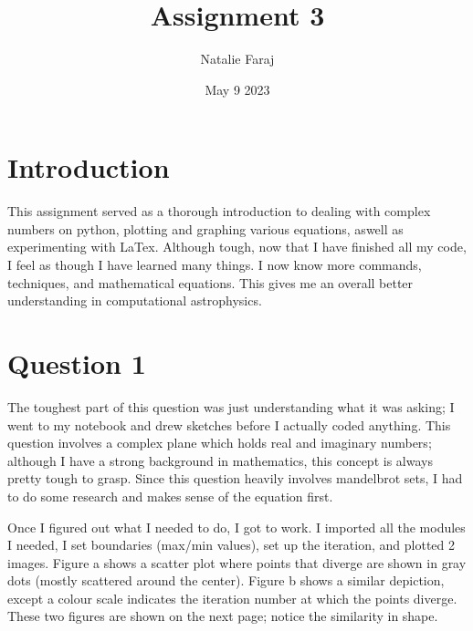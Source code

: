 \documentclass{article}
\title{Assignment 3}
\author{Natalie Faraj }
\date{May 9 2023}
\begin{document}
\maketitle

\section{Introduction}
This assignment served as a thorough introduction to dealing with complex numbers on python, plotting and graphing various equations, aswell as experimenting with LaTex. Although tough, now that I have finished all my code, I feel as though I have learned many things. I now know more commands, techniques, and mathematical equations. This gives me an overall better understanding in computational astrophysics.


\section{Question 1}
The toughest part of this question was just understanding what it was asking; I went to my notebook and drew sketches before I actually coded anything. This question involves a complex plane which holds real and imaginary numbers; although I have a strong background in mathematics, this concept is always pretty tough to grasp. Since this question heavily involves mandelbrot sets, I had to do some research and makes sense of the equation first.


Once I figured out what I needed to do, I got to work. I imported all the modules I needed, I set boundaries (max/min values), set up the iteration, and plotted 2 images. Figure a shows a scatter plot where points that diverge are shown in gray dots (mostly scattered around the center). Figure b shows a similar depiction, except a colour scale indicates the iteration number at which the points diverge. These two figures are shown on the next page; notice the similarity in shape.
\end{document}
